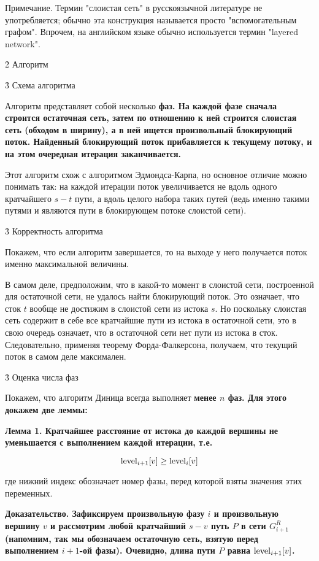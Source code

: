 Примечание. Термин "слоистая сеть" в русскоязычной литературе не употребляется; обычно эта конструкция называется просто "вспомогательным графом". Впрочем, на английском языке обычно используется термин "layered network".



\h2{ Алгоритм }


\h3{ Схема алгоритма }

Алгоритм представляет собой несколько \bf{фаз}. На каждой фазе сначала строится остаточная сеть, затем по отношению к ней строится слоистая сеть (обходом в ширину), а в ней ищется произвольный блокирующий поток. Найденный блокирующий поток прибавляется к текущему потоку, и на этом очередная итерация заканчивается.

Этот алгоритм схож с алгоритмом Эдмондса-Карпа, но основное отличие можно понимать так: на каждой итерации поток увеличивается не вдоль одного кратчайшего $s-t$ пути, а вдоль целого набора таких путей (ведь именно такими путями и являются пути в блокирующем потоке слоистой сети).


\h3{ Корректность алгоритма }

Покажем, что если алгоритм завершается, то на выходе у него получается поток именно максимальной величины.

В самом деле, предположим, что в какой-то момент в слоистой сети, построенной для остаточной сети, не удалось найти блокирующий поток. Это означает, что сток $t$ вообще не достижим в слоистой сети из истока $s$. Но поскольку слоистая сеть содержит в себе все кратчайшие пути из истока в остаточной сети, это в свою очередь означает, что в остаточной сети нет пути из истока в сток. Следовательно, применяя теорему Форда-Фалкерсона, получаем, что текущий поток в самом деле максимален.


\h3{ Оценка числа фаз }

Покажем, что алгоритм Диница всегда выполняет \bf{менее $n$ фаз}. Для этого докажем две леммы:

\bf{Лемма 1}. Кратчайшее расстояние от истока до каждой вершины не уменьшается с выполнением каждой итерации, т.е.

$$ {\rm level}_{i+1}[v] \ge {\rm level}_i[v] $$

где нижний индекс обозначает номер фазы, перед которой взяты значения этих переменных.

\bf{Доказательство}. Зафиксируем произвольную фазу $i$ и произвольную вершину $v$ и рассмотрим любой кратчайший $s-v$ путь $P$ в сети $G^R_{i+1}$ (напомним, так мы обозначаем остаточную сеть, взятую перед выполнением $i+1$-ой фазы). Очевидно, длина пути $P$ равна ${\rm level}_{i+1}[v]$.


